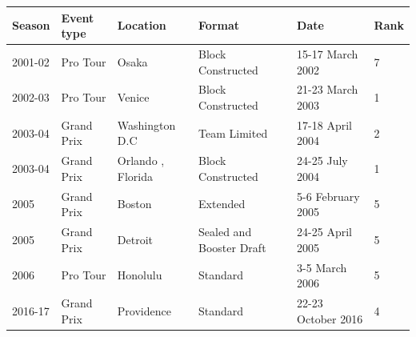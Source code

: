 \documentclass{article}
\begin{document}
\begin{tabular}{llllll}
\toprule
Season & Event type & Location & Format & Date & Rank \\
\midrule
2001-02 & Pro Tour & Osaka & Block Constructed & 15-17 March 2002 & 7 \\
2002-03 & Pro Tour & Venice & Block Constructed & 21-23 March 2003 & 1 \\
2003-04 & Grand Prix & Washington D.C & Team Limited & 17-18 April 2004 & 2 \\
2003-04 & Grand Prix & Orlando , Florida & Block Constructed & 24-25 July 2004 & 1 \\
2005 & Grand Prix & Boston & Extended & 5-6 February 2005 & 5 \\
2005 & Grand Prix & Detroit & Sealed and Booster Draft & 24-25 April 2005 & 5 \\
2006 & Pro Tour & Honolulu & Standard & 3-5 March 2006 & 5 \\
2016-17 & Grand Prix & Providence & Standard & 22-23 October 2016 & 4 \\
\bottomrule
\end{tabular}
\end{document}
